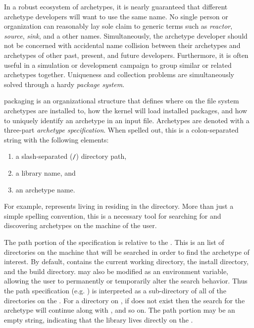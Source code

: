 In a robust ecosystem of archetypes, it is nearly guaranteed that different archetype
developers will want to use the same name. No single person or organization can 
reasonably lay sole claim to generic terms such as \emph{reactor}, \emph{source}, 
\emph{sink}, and a other names. Simultaneously, the archetype developer should not 
be concerned with accidental name collision between their archetypes and archetypes
of other
past, present, and future developers.  Furthermore, it is often useful in a 
simulation or 
development campaign to group similar or related archetypes together. Uniqueness
and collection problems are simultaneously solved through a hardy \emph{package system}.

\cyclus packaging is an organizational structure that defines where on the file system 
archetypes are installed to, how the \cyclus kernel will load installed
packages, and how to uniquely identify an archetype in an input file.  Archetypes 
are denoted with a three-part \emph{archetype specification}. When spelled out, this
is a colon-separated string with the following elements:
\begin{enumerate}
    \item a slash-separated (\texttt{/}) directory path,
    \item a library name, and
    \item an archetype name.
\end{enumerate}
For example,  represents  living
in  residing in the  directory. More than just 
a simple spelling convention, this is a necessary
tool for searching for and discovering archetypes on the machine of the user.

The path portion of the specification is relative to the . This is 
an list of directories on the machine that will be searched in order to find the 
archetype of interest. By default,  contains the current working 
directory, the \cyclus install directory, and the \cyclus build directory. 
 may also be modified as an environment variable, allowing the user
to permanently or temporarily alter the \cyclus search behavior.  Thus the path 
specification (e.g. ) is interpreted as a sub-directory of all of 
the directories on the . For a directory  on 
, if   does not exist then the search for 
the archetype will continue along with , and so on. The path portion 
may be an empty string, indicating that the library lives directly on the 
.

